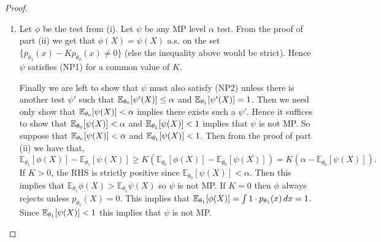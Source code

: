 \begin{proof}
\begin{enumerate}
		\item[(iii)] Let $\phi$ be the test from (i). Let $\psi$ be any MP level $\alpha$ test. From the proof of part (ii) we get that $\phi(X) = \psi(X)$ a.s. on the set $\{	p_{\theta_1}(x) - K p_{\theta_0}(x) \neq 0\}$ (else the inequality above would be strict). Hence $\psi$ satisfies (NP1) for a common value of $K$. 
		
		Finally we are left to show that $\psi$ must also satisfy (NP2) unless there is another test $\psi'$ such that $\mathbb{E}_{\theta_0}[\psi'(X)] \leq \alpha$ and $\mathbb{E}_{\theta_1}[\psi'(X)] = 1$. Then we need only show that $\mathbb{E}_{\theta_0}[\psi(X)] < \alpha$ implies there exists such a $\psi'$. Hence it suffices to show that $\mathbb{E}_{\theta_0}[\psi(X)] < \alpha$ and $\mathbb{E}_{\theta_1}[\psi(X)] < 1$ implies that $\psi$ is not MP. So suppose that $\mathbb{E}_{\theta_0}[\psi(X)] < \alpha$ and $\mathbb{E}_{\theta_1}[\psi(X)] < 1$. Then from the proof of part (ii) we have that, \[
		\mathbb{E}_{\theta_{1}}[\phi(X)] - \mathbb{E}_{\theta_{1}}[\psi(X)] \ge K(\mathbb{E}_{\theta_{0}}[\phi(X)]- \mathbb{E}_{\theta_{0}}[\psi(X)]) = K(\alpha - \mathbb{E}_{\theta_{0}}[\psi(X)]).
		\] If $K > 0$, the RHS is strictly positive since $\mathbb{E}_{\theta_{0}}[\psi(X)] < \alpha$. Then this implies that $\mathbb{E}_{\theta_{1}}\phi(X) > \mathbb{E}_{\theta_{1}}\psi(X)$ so $\psi$ is not MP. If $K = 0$ then $\phi$ always rejects unless $p_{\theta_1}(X) = 0$. This implies that $\mathbb{E}_{\theta_1}[\phi(X)] = \int  1 \cdot p_{\theta_1}(x)\, dx = 1$. Since $\mathbb{E}_{\theta_1}[\psi(X)] < 1$ this implies that $\psi$ is not MP. 
	\end{enumerate}
\end{proof}


